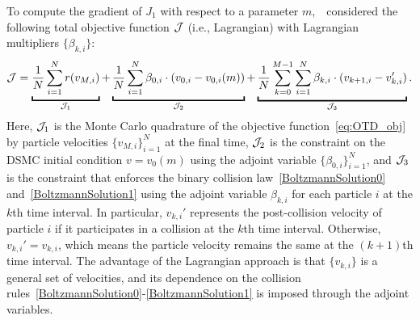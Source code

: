 \documentclass[12pt,nopreprintline]{elsarticle}
\begin{document}
To compute the gradient of $J_1$ with respect to a parameter $m$,~\cite{caflisch2021adjoint}~considered the following total objective function $\mathcal J$ (i.e., Lagrangian) with Lagrangian multipliers $\{\beta_{k,i}\}$:
{
\begin{equation} \label{eq:DTO_obj}
\cJ = \underbracket{\frac{1}{N}\sum_{i=1}^N r(v_{{M},i})}_{\cJ_1} +\underbracket{ \frac{1}{N}\sum_{i=1}^N \beta_{0,i} \cdot \left(v_{0, i}- v_{0,i}(m) \right)}_{\cJ_2}+\underbracket{\frac{1}{N} \sum_{k=0}^{M-1} \sum_{i=1}^N \beta_{k,i} \cdot (v_{k+1,i}-v_{k,i}')}_{\cJ_3}.
\end{equation}
}
Here, $\mathcal J_1$ is the Monte Carlo quadrature of the objective function~\eqref{eq:OTD_obj} by particle velocities $\{v_{M,i}\}_{i=1}^N$ at the final time, $\mathcal J_2$ is the constraint on the DSMC initial condition $v=v_0(m)$ using the adjoint variable $ \{\beta_{0,i}\}_{i=1}^N$, and $\mathcal J_3$ is the constraint that enforces the binary collision law~\eqref{BoltzmannSolution0} and~\eqref{BoltzmannSolution1} using the adjoint variable $\beta_{k,i}$ for each particle $i$ at the $k$th time interval. In particular, $v_{k,i}'$ represents the post-collision velocity of particle $i$ if it participates in a collision at the $k$th time interval. Otherwise, $v_{k,i}' = v_{k,i}$, which means the particle velocity remains the same at the $(k+1)$th time interval. The advantage of the Lagrangian approach is that $\{v_{k,i}\}$ is a general set of velocities, and its dependence on the collision rules~\eqref{BoltzmannSolution0}-\eqref{BoltzmannSolution1} is imposed through the adjoint variables.
\end{document}
